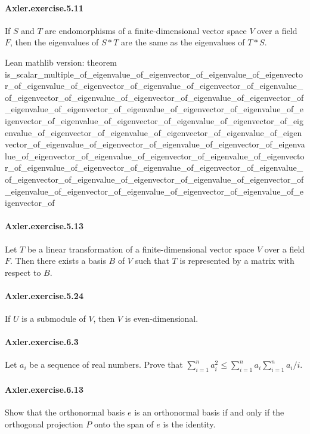\documentclass{article}
\begin{document}
\paragraph{Axler.exercise.5.11} If $S$ and $T$ are endomorphisms of a finite-dimensional vector space $V$ over a field $F$, then the eigenvalues of $S * T$ are the same as the eigenvalues of $T * S$.

Lean mathlib version:
theorem is_scalar_multiple_of_eigenvalue_of_eigenvector_of_eigenvalue_of_eigenvector_of_eigenvalue_of_eigenvector_of_eigenvalue_of_eigenvector_of_eigenvalue_of_eigenvector_of_eigenvalue_of_eigenvector_of_eigenvalue_of_eigenvector_of_eigenvalue_of_eigenvector_of_eigenvalue_of_eigenvector_of_eigenvalue_of_eigenvector_of_eigenvalue_of_eigenvector_of_eigenvalue_of_eigenvector_of_eigenvalue_of_eigenvector_of_eigenvalue_of_eigenvector_of_eigenvalue_of_eigenvector_of_eigenvalue_of_eigenvector_of_eigenvalue_of_eigenvector_of_eigenvalue_of_eigenvector_of_eigenvalue_of_eigenvector_of_eigenvalue_of_eigenvector_of_eigenvalue_of_eigenvector_of_eigenvalue_of_eigenvector_of_eigenvalue_of_eigenvector_of_eigenvalue_of_eigenvector_of_eigenvalue_of_eigenvector_of_eigenvalue_of_eigenvector_of_eigenvalue_of_eigenvector_of_eigenvalue_of_eigenvector_of

\paragraph{Axler.exercise.5.13} Let $T$ be a linear transformation of a finite-dimensional vector space $V$ over a field $F$. Then there exists a basis $B$ of $V$ such that $T$ is represented by a matrix with respect to $B$.

\paragraph{Axler.exercise.5.24} If $U$ is a submodule of $V$, then $V$ is even-dimensional.

\paragraph{Axler.exercise.6.3} Let $a_i$ be a sequence of real numbers. Prove that
  $\sum_{i=1}^n a_i^2 \leq \sum_{i=1}^n a_i \sum_{i=1}^n a_i / i$.

\paragraph{Axler.exercise.6.13} Show that the
  orthonormal basis $e$ is an orthonormal basis if and only if the
  orthogonal projection $P$ onto the span of $e$ is the identity.
\end{document}
